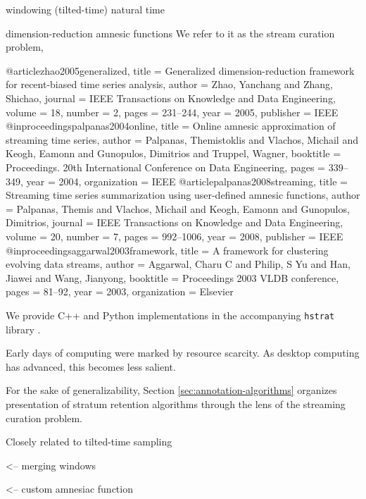 windowing (tilted-time) natural time \citep{giannella2003mining}

dimension-reduction \citep{zhao2005generalized}
amnesic functions \citep{palpanas2008streaming}
We refer to it as the stream curation problem,


@article{zhao2005generalized,
  title     = {Generalized dimension-reduction framework for recent-biased time series analysis},
  author    = {Zhao, Yanchang and Zhang, Shichao},
  journal   = {IEEE Transactions on Knowledge and Data Engineering},
  volume    = {18},
  number    = {2},
  pages     = {231--244},
  year      = {2005},
  publisher = {IEEE}
}
@inproceedings{palpanas2004online,
  title        = {Online amnesic approximation of streaming time series},
  author       = {Palpanas, Themistoklis and Vlachos, Michail and Keogh, Eamonn and Gunopulos, Dimitrios and Truppel, Wagner},
  booktitle    = {Proceedings. 20th International Conference on Data Engineering},
  pages        = {339--349},
  year         = {2004},
  organization = {IEEE}
}
@article{palpanas2008streaming,
  title     = {Streaming time series summarization using user-defined amnesic functions},
  author    = {Palpanas, Themis and Vlachos, Michail and Keogh, Eamonn and Gunopulos, Dimitrios},
  journal   = {IEEE Transactions on Knowledge and Data Engineering},
  volume    = {20},
  number    = {7},
  pages     = {992--1006},
  year      = {2008},
  publisher = {IEEE}
}
@inproceedings{aggarwal2003framework,
  title        = {A framework for clustering evolving data streams},
  author       = {Aggarwal, Charu C and Philip, S Yu and Han, Jiawei and Wang, Jianyong},
  booktitle    = {Proceedings 2003 VLDB conference},
  pages        = {81--92},
  year         = {2003},
  organization = {Elsevier}
}

We provide C++ and Python implementations in the accompanying \texttt{hstrat} library \citep{moreno2022hstrat}.


Early days of computing were marked by resource scarcity.
As desktop computing has advanced, this becomes less salient.

For the sake of generalizability, Section \ref{sec:annotation-algorithms} organizes presentation of stratum retention algorithms through the lens of the streaming curation problem.


Closely related to tilted-time sampling \citep{giannella2003mining,han2005stream}

\citep{zhao2005generalized} <-- merging windows

\citep{palpanas2004online} <-- custom amnesiac function
